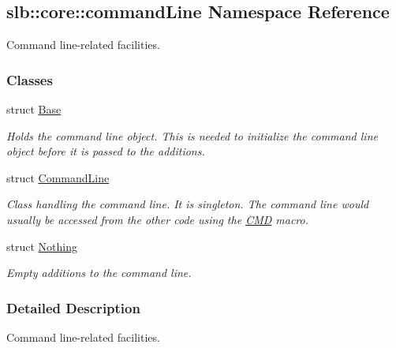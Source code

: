 \hypertarget{namespaceslb_1_1core_1_1commandLine}{}\subsection{slb\+:\+:core\+:\+:command\+Line Namespace Reference}
\label{namespaceslb_1_1core_1_1commandLine}


Command line-\/related facilities.  


\subsubsection*{Classes}
\begin{DoxyCompactItemize}
\item 
struct \hyperlink{structslb_1_1core_1_1commandLine_1_1Base}{Base}
\begin{DoxyCompactList}\small\item\em Holds the command line object. This is needed to initialize the command line object before it is passed to the additions. \end{DoxyCompactList}\item 
struct \hyperlink{structslb_1_1core_1_1commandLine_1_1CommandLine}{Command\+Line}
\begin{DoxyCompactList}\small\item\em Class handling the command line. It is singleton. The command line would usually be accessed from the other code using the \hyperlink{command__line_8h_a0a5ceb9ceb914e08d345410b561cb37a}{C\+MD} macro. \end{DoxyCompactList}\item 
struct \hyperlink{structslb_1_1core_1_1commandLine_1_1Nothing}{Nothing}
\begin{DoxyCompactList}\small\item\em Empty additions to the command line. \end{DoxyCompactList}\end{DoxyCompactItemize}


\subsubsection{Detailed Description}
Command line-\/related facilities. 